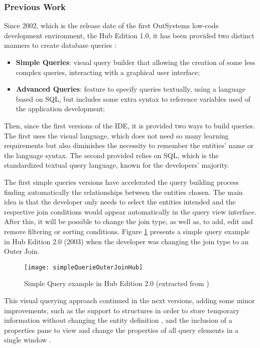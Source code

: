 \subsubsection{Previous Work}
\label{subsubsec:previous_work}

Since 2002, which is the release date of the first OutSystems low-code development environment, the Hub Edition 1.0, it has been provided two distinct manners to create database queries \cite{whatsNotNewInOutsystems}:

\begin{itemize}
	\item \textbf{Simple Queries}: visual query builder that allowing the creation of some less complex queries, interacting with a graphical user interface;
	\item \textbf{Advanced Queries}: feature to specify queries textually, using a language based on SQL, but includes some extra syntax to reference variables used of the application development;
\end{itemize}

Then, since the first versions of the IDE, it is provided two ways to build queries. The first uses the visual language, which does not need so many learning requirements but also diminishes the necessity to remember the entities' name or the language syntax. The second provided relies on SQL, which is the standardized textual query language, known for the developers' majority.

The first simple queries versions have accelerated the query building process finding automatically the relationships between the entities chosen. The main idea is that the developer only needs to select the entities intended and the respective join conditions would appear automatically in the query view interface. After this, it will be possible to change the join type, as well as, to add, edit and remove filtering or sorting conditions. Figure \ref{fig:ss_simpleQuerieOuterJoinHub2} presents a simple query example in Hub Edition 2.0 (2003) when the developer was changing the join type to an Outer Join.

\begin{figure}[htbp]
	\centering
	\texttt{[image: simpleQuerieOuterJoinHub]}
	\caption{Simple Query example in Hub Edition 2.0 (extracted from \cite{whatsNewHub2})}
	\label{fig:ss_simpleQuerieOuterJoinHub2}
\end{figure}

This visual querying approach continued in the next versions, adding some minor improvements, such as the support to structures in order to store temporary information without changing the entity definition \cite{whatsNewHub22}, and the inclusion of a properties pane to view and change the properties of all query elements in a single window \cite{agilePlatform5}.

